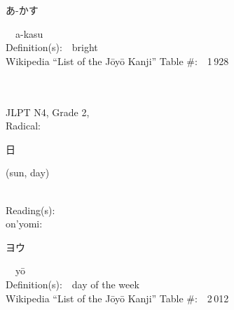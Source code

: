 \begin{multicols}{2}
{\hspace*{2em}}{\begin{CJK}{UTF8}{min} あ-かす \end{CJK}}\ \ a-kasu\ \ \\
Definition(s):\ \ bright \\
Wikipedia ``List of the J\=oy\=o Kanji'' Table \#:\ \ 1\,928 \\
\ \ \\
{\fontsize{34pt}{40pt}  }\ \ \\  %
{JLPT N4, Grade 2, \\Radical:\ \ {\begin{CJK}{UTF8}{min} 日 \end{CJK}} (sun, day) } \\
Reading(s):\ \ \\
{\hspace*{1em}}on'yomi:\ \ \\
{\hspace*{2em}}{\begin{CJK}{UTF8}{min} ヨウ \end{CJK}}\ \ y\=o\ \ \\
Definition(s):\ \ day of the week \\
Wikipedia ``List of the J\=oy\=o Kanji'' Table \#:\ \ 2\,012 \\
\ \ \\
\end{multicols}



